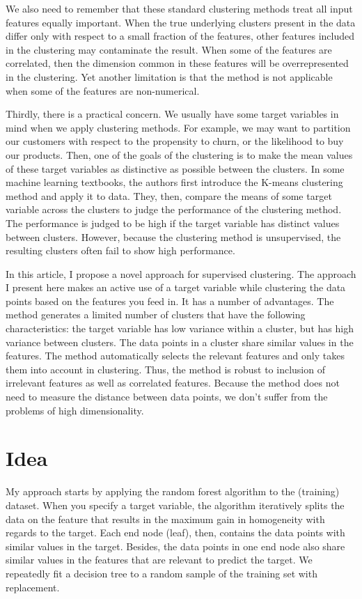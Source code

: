 \documentclass{article}
\begin{document}
We also need to remember that these standard clustering methods treat all input features equally important. When the true underlying clusters present in the data differ only with respect to a small fraction of the features, other features included in the clustering may contaminate the result. When some of the features are correlated, then the dimension common in these features will be overrepresented in the clustering. Yet another limitation is that the method is not applicable when some of the features are non-numerical.

Thirdly, there is a practical concern. We usually have some target variables in mind when we apply clustering methods. For example, we may want to partition our customers with respect to the propensity to churn, or the likelihood to buy our products. Then, one of the goals of the clustering is to make the mean values of these target variables as distinctive as possible between the clusters. In some machine learning textbooks, the authors first introduce the K-means clustering method and apply it to data. They, then, compare the means of some target variable across the clusters to judge the performance of the clustering method. The performance is judged to be high if the target variable has distinct values between clusters. However, because the clustering method is unsupervised, the resulting clusters often fail to show high performance.

In this article, I propose a novel approach for supervised clustering. The approach I present here makes an active use of a target variable while clustering the data points based on the features you feed in. It has a number of advantages. The method generates a limited number of clusters that have the following characteristics: the target variable has low variance within a cluster, but has high variance between clusters. The data points in a cluster share similar values in the features. The method automatically selects the relevant features and only takes them into account in clustering. Thus, the method is robust to inclusion of irrelevant features as well as correlated features. Because the method does not need to measure the distance between data points, we don't suffer from the problems of high dimensionality.

\section{Idea}
My approach starts by applying the random forest algorithm to the (training) dataset. When you specify a target variable, the algorithm iteratively splits the data on the feature that results in the maximum gain in homogeneity with regards to the target. Each end node (leaf), then, contains the data points with similar values in the target. Besides, the data points in one end node also share similar values in the features that are relevant to predict the target. We repeatedly fit a decision tree to a random sample of the training set with replacement.
\end{document}
